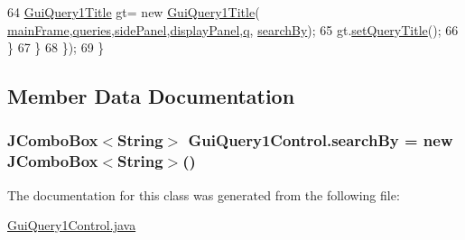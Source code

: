 \begin{DoxyCode}
64                     \hyperlink{classGuiQuery1Title}{GuiQuery1Title} gt= \textcolor{keyword}{new} \hyperlink{classGuiQuery1Title}{GuiQuery1Title}(
      \hyperlink{classGUIQuery_aba988b5bec899d53480a472de7b87dfa}{mainFrame},\hyperlink{classGUIQuery_a0db8bd960b4512cadf9aa40642934680}{queries},\hyperlink{classGUIQuery_a70e233b1f14874166b7707edebe825d2}{sidePanel},\hyperlink{classGUIQuery_a8b4dbf257e0859c597591f072349b75c}{displayPanel},\hyperlink{classGUIQuery_a2a20445d749185552014142b78f3e071}{q},
      \hyperlink{classGuiQuery1Control_aff1971237254429cafcc0c76a1937793}{searchBy});
65                    gt.\hyperlink{classGuiQuery1Title_ab549b18802bf2e90895154fbb4d9d51b}{setQueryTitle}();
66                 \}
67             \}
68         \});
69     \}   
\end{DoxyCode}


\subsection{Member Data Documentation}
\subsubsection[{\texorpdfstring{search\+By}{searchBy}}]{\setlength{\rightskip}{0pt plus 5cm}J\+Combo\+Box$<$String$>$ Gui\+Query1\+Control.\+search\+By = new J\+Combo\+Box$<$String$>$()\hspace{0.3cm}{\ttfamily [private]}}\hypertarget{classGuiQuery1Control_aff1971237254429cafcc0c76a1937793}{}\label{classGuiQuery1Control_aff1971237254429cafcc0c76a1937793}


The documentation for this class was generated from the following file\+:\begin{DoxyCompactItemize}
\item 
\hyperlink{GuiQuery1Control_8java}{Gui\+Query1\+Control.\+java}\end{DoxyCompactItemize}
